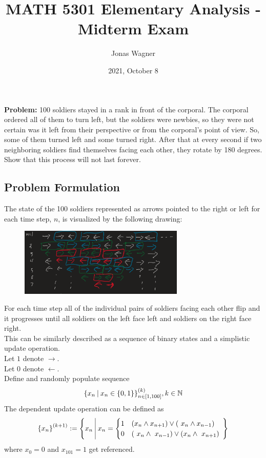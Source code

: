 \documentclass[]{article}
\title{MATH 5301 Elementary Analysis - Midterm Exam}
\author{Jonas Wagner}
\date{2021, October 8}
\newcommand{\N}{\mathbb{N}}
\newcommand{\st}{ \ \vline \ }
\begin{document}
\maketitle

\section{}
\textbf{Problem:} 100 soldiers stayed in a rank in front of the corporal. 
The corporal ordered all of them to turn left, but the soldiers were newbies, 
so they were not certain was it left from their perspective or from the corporal’s 
point of view. So, some of them turned left and some turned right. After that 
at every second if two neighboring soldiers find themselves facing each other,
they rotate by 180 degrees. Show that this process will not last forever.

\subsection*{Problem Formulation}
The state of the 100 soldiers represented as arrows pointed to the right or left 
for each time step, $n$, is visualized by the following drawing:\\
\begin{figure}[h]
    \centering
    \includegraphics[width=0.7\textwidth]{MidExam1_pblm1_a.png}
\end{figure}

For each time step all of the individual pairs of soldiers facing each other 
flip and it progresses until all soldiers on the left face left and soldiers 
on the right face right.\\

This can be similarly described as a sequence of binary states and a simplistic update 
operation.\\
Let $1$ denote $\rightarrow$.\\
Let $0$ denote $\leftarrow$.\\
Define and randomly populate sequence 
$$\qty{x_n \st x_n \in \{0,1\} }_{n \in [1,100]}^{(k)}, k \in \N$$
The dependent update operation can be defined as 
$$\qty{x_n}^{(k+1)} 
    := \qty{x_n \st x_n = 
    \begin{cases}
        1   & (x_n \land x_{n+1}) \lor (~x_n \land x_{n-1})\\
        0   & (~x_n \land ~x_{n-1}) \lor (x_n \land ~x_{n+1})
    \end{cases}
    \
    }
$$
where $x_0 = 0$ and $x_{101} = 1$ get referenced.\\
\end{document}
